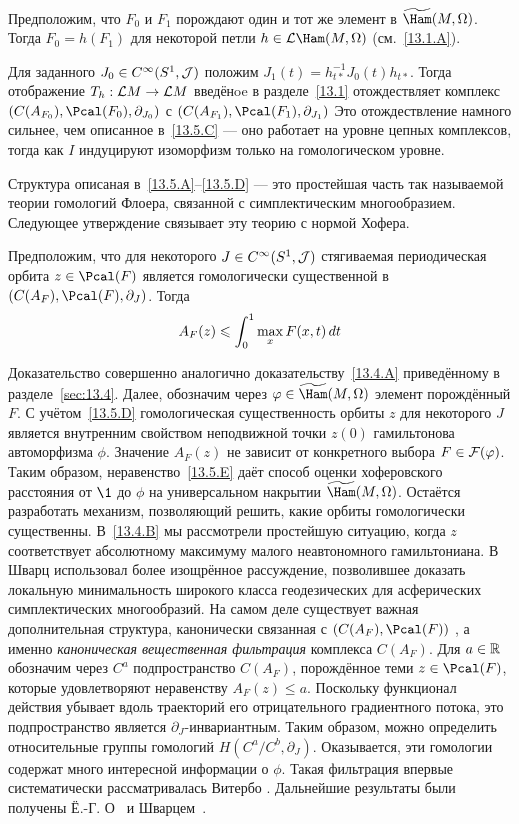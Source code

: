 \begin{ex}{}\label{13.5.D}
Предположим, что $F_{0}$ и $F_{1}$ порождают один и тот же элемент в
$\widetilde\Ham(M,\Omega)$. 
Тогда $F_{0} = h(F_{1})$ для некоторой петли $h\in\L\Ham(M,\Omega)$
(см.~\ref{13.1.A}).
\end{ex}

Для заданного $J_{0}\in C^{\infty}(S^{1},\mathcal{J})$ положим
$J_{1}(t)=h_{t*}^{-1}J_{0}(t)h_{t*}$. Тогда отображение $T_{h}:\mathcal{L}
M\to\mathcal{L} M$ введёнoe в разделе~\ref{13.1} отождествляет
комплекс $(C(A_{F_{0}}),\Pcal(F_{0}),\partial_{J_{0}})$ с
$(C(A_{F_{1}}),\Pcal(F_{1}),\partial_{J_{1}})$ 
Это отождествление намного сильнее, чем описанное в~\ref{13.5.C}
— оно работает на уровне цепных комплексов, тогда как $I$ индуцируют
изоморфизм только на гомологическом уровне. 

\medskip
Структура описаная в~\ref{13.5.A}--\ref{13.5.D} --- это простейшая
часть так называемой теории гомологий 
Флоера, связанной с симплектическим многообразием. 
Следующее утверждение связывает эту теорию с нормой Хофера.

\begin{ex}{}\label{13.5.E}
Предположим, что для некоторого $J\in C^{\infty}(S^{1},\mathcal{J})$
стягиваемая периодическая орбита $z\in\Pcal(F)$ является гомологически
существенной в $(C(A_{F}),\Pcal(F),\partial_{J})$. Тогда
\[
A_{F}(z)\leqslant\int_{0}^{1}\max_{x}F(x,t)\,d t
\]
\end{ex}

Доказательство совершенно аналогично доказательству~\ref{13.4.A}
приведённому в разделе~\ref{sec:13.4}.
Далее, обозначим через $\phi\in\widetilde\Ham(M,\Omega)$ элемент порождённый $F$.
С учётом~\ref{13.5.D} гомологическая
существенность орбиты $z$ для некоторого $J$ является внутренним свойством
неподвижной точки $z(0)$ гамильтонова автоморфизма $\phi$.
Значение $A_{F}(z)$ не зависит от конкретного выбора $F\in\mathcal{F}(\varphi)$.
Таким образом, неравенство~\ref{13.5.E} даёт способ оценки хоферовского расстояния от $\1$ до $\phi$ на универсальном накрытии $\widetilde\Ham(M,\Omega)$.
Остаётся разработать механизм, позволяющий решить, какие орбиты
гомологически существенны. 
В~\ref{13.4.B} мы рассмотрели простейшую ситуацию, когда $z$ соответствует абсолютному максимуму малого неавтономного гамильтониана. 
В~\cite{Sch3} Шварц использовал более изощрённое
рассуждение, позволившее доказать локальную минимальность широкого
класса геодезических для асферических симплектических многообразий.  
На самом деле существует важная дополнительная структура,
канонически связанная с $(C(A_{F}),\Pcal(F))$
, а именно
\textit{каноническая вещественная фильтрация} комплекса $C(A_{F})$.
Для $a\in\mathbb{R}$ обозначим через $C^{a}$ подпространство $C(A_{F})$,
порождённое теми $z\in\Pcal(F)$, которые удовлетворяют неравенству
$A_{F}(z)\le a$.
Поскольку функционал действия убывает вдоль траекторий его
отрицательного градиентного потока, это подпространство является
$\partial_{J}$-инвариантным. 
Таким образом, можно определить относительные группы гомологий
$H(C^{a}/C^{b},\partial_{J})$.
Оказывается, эти гомологии содержат много интересной информации о $\phi$.
Такая фильтрация впервые систематически рассматривалась Витербо \cite{V1}.
Дальнейшие результаты были получены Ё.-Г. О~\cite{O4} и Шварцем~\cite{Sch3}.

